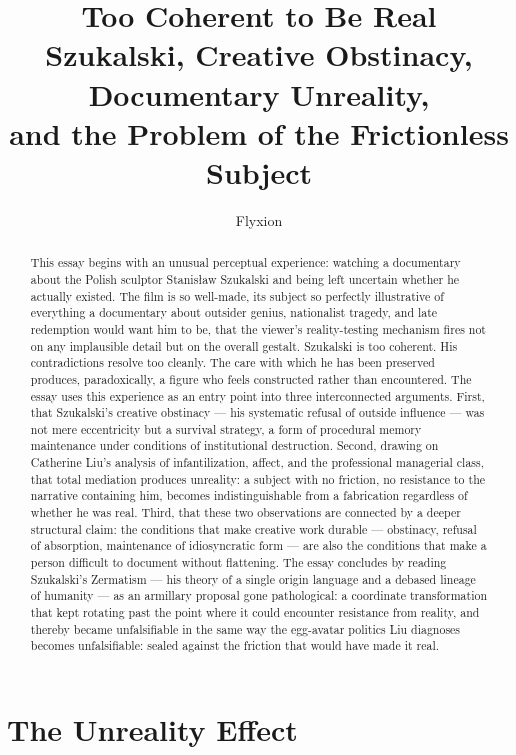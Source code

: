 \documentclass[11pt, a4paper]{article}
\title{%
  \textbf{Too Coherent to Be Real}\\[0.4em]
  \large Szukalski, Creative Obstinacy, Documentary Unreality,\\
  and the Problem of the Frictionless Subject
}
\author{Flyxion}
\date{}
\theoremstyle{named}
\begin{document}
\maketitle
\thispagestyle{empty}

\begin{abstract}
This essay begins with an unusual perceptual experience: watching a
documentary about the Polish sculptor Stanis\l{}aw Szukalski and being
left uncertain whether he actually existed. The film is so well-made,
its subject so perfectly illustrative of everything a documentary about
outsider genius, nationalist tragedy, and late redemption would want
him to be, that the viewer's reality-testing mechanism fires not on
any implausible detail but on the overall gestalt. Szukalski is too
coherent. His contradictions resolve too cleanly. The care with which
he has been preserved produces, paradoxically, a figure who feels
constructed rather than encountered. The essay uses this experience
as an entry point into three interconnected arguments. First, that
Szukalski's creative obstinacy — his systematic refusal of outside
influence — was not mere eccentricity but a survival strategy, a form
of procedural memory maintenance under conditions of institutional
destruction. Second, drawing on Catherine Liu's analysis of
infantilization, affect, and the professional managerial class, that
total mediation produces unreality: a subject with no friction, no
resistance to the narrative containing him, becomes indistinguishable
from a fabrication regardless of whether he was real. Third, that these
two observations are connected by a deeper structural claim: the
conditions that make creative work durable — obstinacy, refusal of
absorption, maintenance of idiosyncratic form — are also the conditions
that make a person difficult to document without flattening. The essay
concludes by reading Szukalski's Zermatism — his theory of a single
origin language and a debased lineage of humanity — as an armillary
proposal gone pathological: a coordinate transformation that kept
rotating past the point where it could encounter resistance from
reality, and thereby became unfalsifiable in the same way the egg-avatar
politics Liu diagnoses becomes unfalsifiable: sealed against the
friction that would have made it real.
\end{abstract}

\newpage
\tableofcontents
\newpage

\section{The Unreality Effect}
\end{document}
